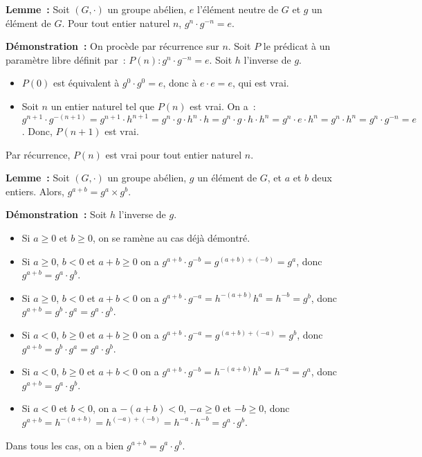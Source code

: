 \medskip

\noindent\textbf{Lemme :} Soit $(G,\cdot)$ un groupe abélien, $e$ l'élément neutre de $G$ et $g$ un élément de $G$.
    Pour tout entier naturel $n$, $g^n \cdot g^{-n} = e$.

\medskip

\noindent\textbf{Démonstration :} 
    On procède par récurrence sur $n$. 
    Soit $P$ le prédicat à un paramètre libre définit par : $P(n): g^n \cdot g^{-n} = e$.
    Soit $h$ l'inverse de $g$. 
    \begin{itemize}[nosep]
        \item $P(0)$ est équivalent à $g^0 \cdot g^0 = e$, donc à $e \cdot e = e$, qui est vrai.
        \item Soit $n$ un entier naturel tel que $P(n)$ est vrai.
            On a : $g^{n+1} \cdot g^{-(n+1)} = g^{n+1} \cdot h^{n+1} = g^n \cdot g \cdot h^n \cdot h = g^n \cdot g \cdot h \cdot h^n = g^n \cdot e \cdot h^n = g^n \cdot h^n = g^n \cdot g^{-n} = e$.
            Donc, $P(n+1)$ est vrai.
    \end{itemize}
    Par récurrence, $P(n)$ est vrai pour tout entier naturel $n$.

    \done

\medskip

\noindent\textbf{Lemme :} Soit $(G,\cdot)$ un groupe abélien, $g$ un élément de $G$, et $a$ et $b$ deux entiers.
    Alors, $g^{a+b} = g^a \times g^b$.

\medskip

\noindent\textbf{Démonstration :} Soit $h$ l'inverse de $g$. 
    \begin{itemize}[nosep]
        \item Si $a \geq 0$ et $b \geq 0$, on se ramène au cas déjà démontré.
        \item Si $a \geq 0$, $b < 0$ et $a+b \geq 0$ on a $g^{a+b} \cdot g^{-b} = g^{(a+b) + (-b)}= g^a$, donc $g^{a+b} = g^a \cdot g^b$.
        \item Si $a \geq 0$, $b < 0$ et $a+b < 0$ on a $g^{a+b} \cdot g^{-a} = h^{-(a+b)} h^a = h^{-b} = g^b$, donc $g^{a+b} = g^b \cdot g^a = g^a \cdot g^b$.
        \item Si $a < 0$, $b \geq 0$ et $a+b \geq 0$ on a $g^{a+b} \cdot g^{-a} = g^{(a+b) + (-a)} = g^b$, donc $g^{a+b} = g^b \cdot g^a = g^a \cdot g^b$.
        \item Si $a < 0$, $b \geq 0$ et $a+b < 0$ on a $g^{a+b} \cdot g^{-b} = h^{-(a+b)} h^b = h^{-a} = g^a$, donc $g^{a+b} = g^a \cdot g^b$.
        \item Si $a < 0$ et $b < 0$, on a $-(a+b) < 0$, $-a \geq 0$ et $-b \geq 0$, donc $g^{a+b} = h^{-(a+b)} = h^{(-a) + (-b)} = h^{-a} \cdot h^{-b} = g^a \cdot g^b$.
    \end{itemize}
    Dans tous les cas, on a bien $g^{a+b} = g^a \cdot g^b$.

